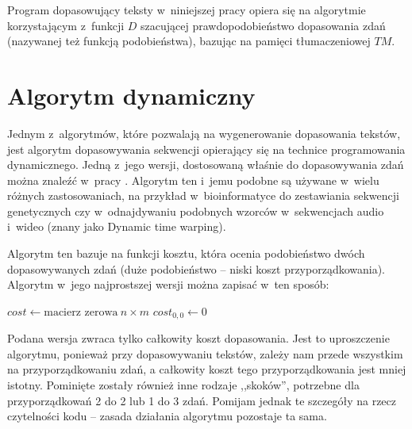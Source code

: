 \documentclass{pracamgr}
\begin{document}
Program dopasowujący teksty w~niniejszej pracy opiera się na
algorytmie korzystającym z~funkcji $D$ szacującej prawdopodobieństwo
dopasowania zdań (nazywanej też funkcją podobieństwa), bazując na
pamięci tłumaczeniowej $TM$.

\section{Algorytm dynamiczny}

Jednym z~algorytmów, które pozwalają na wygenerowanie dopasowania
tekstów, jest algorytm dopasowywania sekwencji opierający się na
technice programowania dynamicznego. Jedną z~jego wersji, dostosowaną
właśnie do dopasowywania zdań można znaleźć w~pracy
\cite{church+gale}. Algorytm ten i~jemu podobne są używane w~wielu
różnych zastosowaniach, na przykład w~bioinformatyce do zestawiania
sekwencji genetycznych czy w~odnajdywaniu podobnych wzorców
w~sekwencjach audio i~wideo (znany jako Dynamic time warping).

Algorytm ten bazuje na funkcji kosztu, która ocenia podobieństwo dwóch
dopasowywanych zdań (duże podobieństwo -- niski koszt
przyporządkowania). Algorytm w~jego najprostszej wersji można zapisać
w~ten sposób:

\begin{algorithm}[H]


  $cost \leftarrow \mbox{macierz zerowa}\ n \times m$ \;
  $cost_{0, 0} \leftarrow 0$ \;
  \;

\end{algorithm}

Podana wersja zwraca tylko całkowity koszt dopasowania. Jest to
uproszczenie algorytmu, ponieważ przy dopasowywaniu tekstów, zależy
nam przede wszystkim na przyporządkowaniu zdań, a całkowity koszt tego
przyporządkowania jest mniej istotny. Pominięte zostały również inne
rodzaje ,,skoków'', potrzebne dla przyporządkowań 2 do 2 lub 1 do 3
zdań. Pomijam jednak te szczegóły na rzecz czytelności kodu -- zasada
działania algorytmu pozostaje ta sama.
\end{document}
